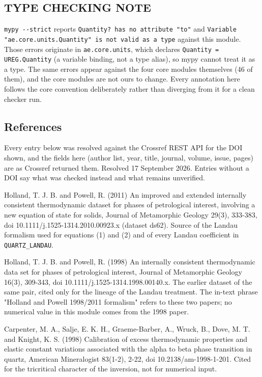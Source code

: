 \documentclass[10pt,a4paper,twoside]{report}
\begin{document}
\subsection*{TYPE CHECKING NOTE}

\texttt{mypy -{}-strict} reports \texttt{Quantity? has no attribute "to"} and \texttt{Variable "ae.core.units.Quantity" is not valid as a type} against this module. Those errors originate in \texttt{ae.core.units}, which declares \texttt{Quantity = UREG.Quantity} (a variable binding, not a type alias), so mypy cannot treat it as a type. The same errors appear against the four core modules themselves (46 of them), and the core modules are not ours to change. Every annotation here follows the core convention deliberately rather than diverging from it for a clean checker run.

\subsection*{References}

Every entry below was resolved against the Crossref REST API for the DOI shown, and the fields here (author list, year, title, journal, volume, issue, pages) are as Crossref returned them. Resolved 17 September 2026. Entries without a DOI say what was checked instead and what remains unverified.

Holland, T. J. B. and Powell, R. (2011) An improved and extended internally consistent thermodynamic dataset for phases of petrological interest, involving a new equation of state for solids, Journal of Metamorphic Geology 29(3), 333-383, doi 10.1111/j.1525-1314.2010.00923.x (dataset ds62). Source of the Landau formalism used for equations (1) and (2) and of every Landau coefficient in \texttt{QUARTZ\_LANDAU}.

Holland, T. J. B. and Powell, R. (1998) An internally consistent thermodynamic data set for phases of petrological interest, Journal of Metamorphic Geology 16(3), 309-343, doi 10.1111/j.1525-1314.1998.00140.x. The earlier dataset of the same pair, cited only for the lineage of the Landau treatment. The in-text phrase "Holland and Powell 1998/2011 formalism" refers to these two papers; no numerical value in this module comes from the 1998 paper.

Carpenter, M. A., Salje, E. K. H., Graeme-Barber, A., Wruck, B., Dove, M. T. and Knight, K. S. (1998) Calibration of excess thermodynamic properties and elastic constant variations associated with the alpha to beta phase transition in quartz, American Mineralogist 83(1-2), 2-22, doi 10.2138/am-1998-1-201. Cited for the tricritical character of the inversion, not for numerical input.
\end{document}
